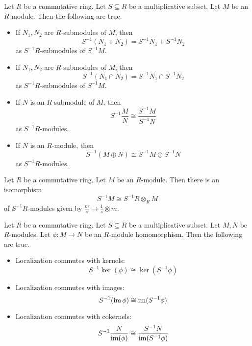 \documentclass[a4paper]{article}
\begin{document}
\begin{crl}{}{} Let $R$ be a commutative ring. Let $S\subseteq R$ be a multiplicative subset. Let $M$ be an $R$-module. Then the following are true. 
\begin{itemize}
\item If $N_1,N_2$ are $R$-submodules of $M$, then $$S^{-1}(N_1+N_2)=S^{-1}N_1+S^{-1}N_2$$ as $S^{-1}R$-submodules of $S^{-1}M$. 
\item If $N_1,N_2$ are $R$-submodules of $M$, then $$S^{-1}(N_1\cap N_2)=S^{-1}N_1\cap S^{-1}N_2$$ as $S^{-1}R$-submodules of $S^{-1}M$. 
\item If $N$ is an $R$-submodule of $M$, then $$S^{-1}\frac{M}{N}\cong\frac{S^{-1}M}{S^{-1}N}$$ as $S^{-1}R$-modules. 
\item If $N$ is an $R$-module, then $$S^{-1}(M\oplus N)\cong S^{-1}M\oplus S^{-1}N$$ as $S^{-1}R$-modules. 
\end{itemize}
\end{crl}

\begin{prp}{}{} Let $R$ be a commutative ring. Let $M$ be an $R$-module. Then there is an isomorphism $$S^{-1}M\cong S^{-1}R\otimes_RM$$ of $S^{-1}R$-modules given by $\frac{m}{s}\mapsto\frac{1}{s}\otimes m$. 
\end{prp}

\begin{lmm}{}{} Let $R$ be a commutative ring. Let $S\subseteq R$ be a multiplicative subset. Let $M,N$ be $R$-modules. Let $\phi:M\to N$ be an $R$-module homomorphism. Then the following are true. 
\begin{itemize}
\item Localization commutes with kernels: $$S^{-1}\ker(\phi)\cong\ker(S^{-1}\phi)$$
\item Localization commutes with images: $$S^{-1}(\operatorname{im}\phi)\cong\operatorname{im}(S^{-1}\phi)$$
\item Localization commutes with cokernels: $$S^{-1}\frac{N}{\operatorname{im}(\phi)}\cong\frac{S^{-1}N}{\operatorname{im}(S^{-1}\phi)}$$
\end{itemize}
\end{lmm}
\end{document}
